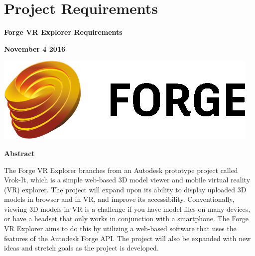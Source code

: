 \documentclass[letterpaper, 10pt, draftclsnofoot, compsoc, onecolumn]{IEEEtran}
\begin{document}
\newpage
\clearpage\setcounter{page}{1}\pagestyle{Standard}
\thispagestyle{FirstPage}

\bigskip

\section{Project Requirements}
{\centering{}\bfseries\color{black}
Forge VR Explorer Requirements
\par}


\bigskip

{\centering{}\bfseries\color{black}
November 4 2016
\par}
\bigskip
\bigskip
\bigskip
\bigskip
\bigskip
\bigskip
\bigskip
\bigskip
\bigskip
\bigskip
\bigskip
\bigskip
\begin{center}
	\includegraphics[scale=0.8]{forge_logo.png}
\end{center}


\vfill
{\centering{}\bfseries\color{black}
Abstract
\par}

{\centering{}\mdseries\color{black}
	The Forge VR Explorer branches from an Autodesk prototype project called Vrok-It, which is a simple web-based 3D 
	model viewer and mobile virtual reality (VR) explorer. The project will expand upon its ability to display uploaded 3D 
	models in browser and in VR, and improve its accessibility. Conventionally, viewing 3D models in VR is a challenge if 
	you have model files on many devices, or have a headset that only works in conjunction with a smartphone. The 
	Forge VR Explorer aims to do this by utilizing a web-based software that uses the features of the Autodesk Forge API. 
	The project will also be expanded with new ideas and stretch goals as the project is developed.
\par}

\bigskip
\bigskip

\end{document}
